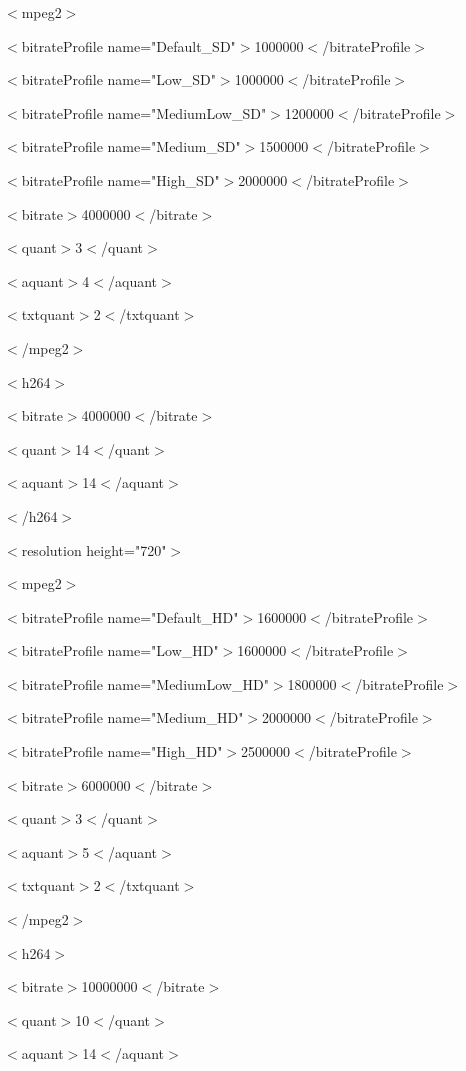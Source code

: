 \documentclass{article}
\begin{document}
$<$mpeg2$>$

$<$bitrateProfile name="Default\_SD"$>$1000000$<$/bitrateProfile$>$

$<$bitrateProfile name="Low\_SD"$>$1000000$<$/bitrateProfile$>$

$<$bitrateProfile name="MediumLow\_SD"$>$1200000$<$/bitrateProfile$>$

$<$bitrateProfile name="Medium\_SD"$>$1500000$<$/bitrateProfile$>$

$<$bitrateProfile name="High\_SD"$>$2000000$<$/bitrateProfile$>$

$<$bitrate$>$4000000$<$/bitrate$>$

$<$quant$>$3$<$/quant$>$

$<$aquant$>$4$<$/aquant$>$

$<$txtquant$>$2$<$/txtquant$>$

$<$/mpeg2$>$

$<$h264$>$

$<$bitrate$>$4000000$<$/bitrate$>$

$<$quant$>$14$<$/quant$>$

$<$aquant$>$14$<$/aquant$>$

$<$/h264$>$
\newline
\newline

$<$resolution height="720"$>$

$<$mpeg2$>$

$<$bitrateProfile name="Default\_HD"$>$1600000$<$/bitrateProfile$>$

$<$bitrateProfile name="Low\_HD"$>$1600000$<$/bitrateProfile$>$

$<$bitrateProfile name="MediumLow\_HD"$>$1800000$<$/bitrateProfile$>$

$<$bitrateProfile name="Medium\_HD"$>$2000000$<$/bitrateProfile$>$

$<$bitrateProfile name="High\_HD"$>$2500000$<$/bitrateProfile$>$

$<$bitrate$>$6000000$<$/bitrate$>$

$<$quant$>$3$<$/quant$>$

$<$aquant$>$5$<$/aquant$>$

$<$txtquant$>$2$<$/txtquant$>$

$<$/mpeg2$>$

$<$h264$>$

$<$bitrate$>$10000000$<$/bitrate$>$

$<$quant$>$10$<$/quant$>$

$<$aquant$>$14$<$/aquant$>$
\end{document}

